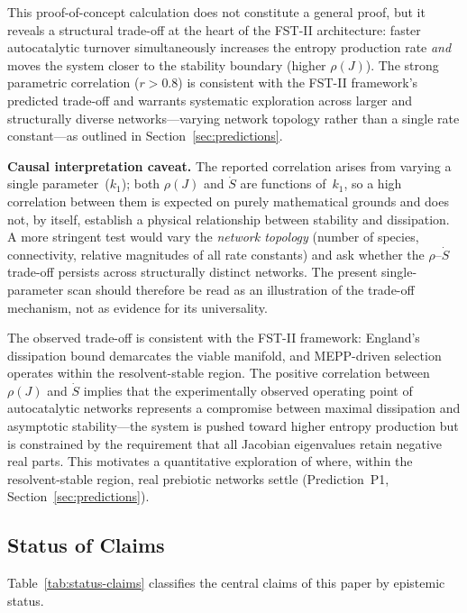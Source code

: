 \documentclass[12pt,a4paper]{article}
\theoremstyle{remark}
\begin{document}
This proof-of-concept calculation does not constitute a general proof, but it reveals a structural trade-off at the heart of the FST-II architecture: faster autocatalytic turnover simultaneously increases the entropy production rate \emph{and} moves the system closer to the stability boundary (higher $\rho(J)$).
The strong parametric correlation ($r>0.8$) is consistent with the FST-II framework's predicted trade-off and warrants systematic exploration across larger and structurally diverse networks---varying network topology rather than a single rate constant---as outlined in Section~\ref{sec:predictions}.

\textbf{Causal interpretation caveat.} The reported correlation arises from varying a single parameter~($k_1$); both $\rho(J)$ and $\dot{S}$ are functions of~$k_1$, so a high correlation between them is expected on purely mathematical grounds and does not, by itself, establish a physical relationship between stability and dissipation. A more stringent test would vary the \emph{network topology} (number of species, connectivity, relative magnitudes of all rate constants) and ask whether the $\rho$--$\dot{S}$ trade-off persists across structurally distinct networks. The present single-parameter scan should therefore be read as an illustration of the trade-off mechanism, not as evidence for its universality.

The observed trade-off is consistent with the FST-II framework: England's dissipation bound demarcates the viable manifold, and MEPP-driven selection operates within the resolvent-stable region. The positive correlation between $\rho(J)$ and $\dot{S}$ implies that the experimentally observed operating point of autocatalytic networks represents a compromise between maximal dissipation and asymptotic stability---the system is pushed toward higher entropy production but is constrained by the requirement that all Jacobian eigenvalues retain negative real parts. This motivates a quantitative exploration of where, within the resolvent-stable region, real prebiotic networks settle (Prediction~P1, Section~\ref{sec:predictions}).

\subsection{Status of Claims}

Table~\ref{tab:status-claims} classifies the central claims of this paper by epistemic status.
\end{document}
